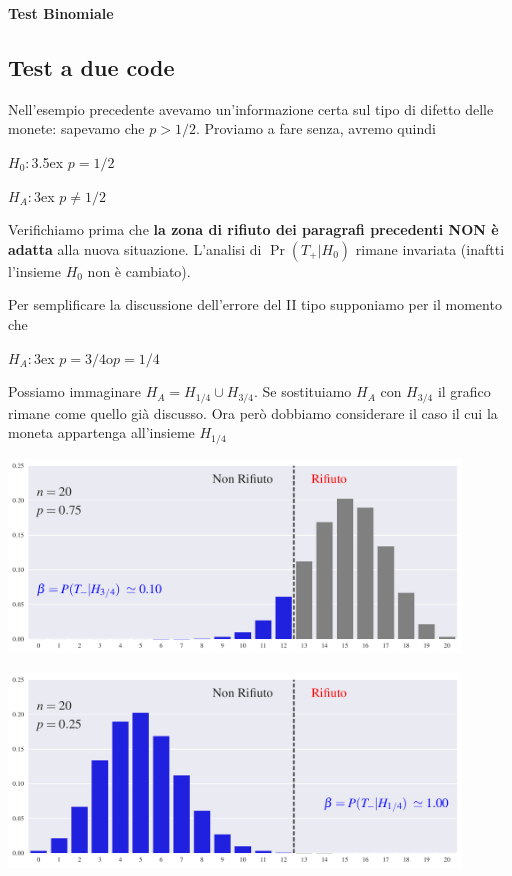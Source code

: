 \documentclass[12pt,openany]{book}
\theoremstyle{mio}
\theoremstyle{liscio}
\begin{document}
\hfill{}\clearpage\hfill\textbf{Test Binomiale}\subsection{Test a due code}

Nell'esempio precedente avevamo un'informazione certa sul tipo di difetto delle monete: sapevamo che $p>1/2$. Proviamo a fare senza, avremo quindi

$H_0:$\kern3.5ex $p=1/2$

$H_A:$\kern3ex $p\neq1/2$

Verifichiamo prima che  \textbf{la zona di rifiuto dei paragrafi precedenti NON è adatta\/} alla nuova situazione. L'analisi di $\Pr(T_+|H_0)$ rimane invariata (inaftti l'insieme $H_0$ non è cambiato).

Per semplificare la discussione dell'errore del II tipo supponiamo per il momento che 

$H_A:$\kern3ex $p=3/4$\quad o\quad $p=1/4$ 

Possiamo immaginare $H_A=H_{{1/4}}\cup H_{{3/4}}$. Se sostituiamo $H_A$ con $H_{{3/4}}$ il grafico rimane come quello già discusso. Ora però dobbiamo considerare il caso il cui la moneta appartenga all'insieme $H_{{1/4}}$

\hfil\includegraphics[width=0.9\textwidth]{figure/B-test_02.pdf}

\hfil\includegraphics[width=0.9\textwidth]{figure/B-test_03.pdf}
\end{document}
